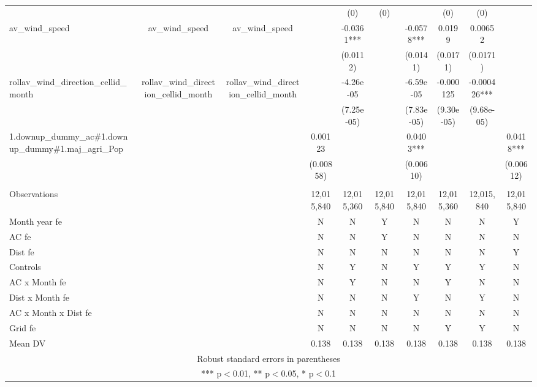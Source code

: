 \documentclass[]{article}
\begin{document}
\begin{tabular}{lccccccccc}
 &  &  &  & (0) & (0) &  & (0) & (0) &  \\
av\_wind\_speed & av\_wind\_speed & av\_wind\_speed &  & -0.0361*** &  & -0.0578*** & 0.0199 & 0.00652 &  \\
 &  &  &  & (0.0112) &  & (0.0141) & (0.0171) & (0.0171) &  \\
rollav\_wind\_direction\_cellid\_month & rollav\_wind\_direction\_cellid\_month & rollav\_wind\_direction\_cellid\_month &  & -4.26e-05 &  & -6.59e-05 & -0.000125 & -0.000426*** &  \\
 &  &  &  & (7.25e-05) &  & (7.83e-05) & (9.30e-05) & (9.68e-05) &  \\
1.downup\_dummy\_ac\#1.downup\_dummy\#1.maj\_agri\_Pop &  &  & 0.00123 &  &  & 0.0403*** &  &  & 0.0418*** \\
 &  &  & (0.00858) &  &  & (0.00610) &  &  & (0.00612) \\
 &  &  &  &  &  &  &  &  &  \\
Observations &  &  & 12,015,840 & 12,015,360 & 12,015,840 & 12,015,840 & 12,015,360 & 12,015,840 & 12,015,840 \\
Month year fe &  &  & N & N & Y & N & N & N & Y \\
AC fe &  &  & N & N & Y & N & N & N & N \\
Dist fe &  &  & N & N & N & N & N & N & Y \\
Controls &  &  & N & Y & N & Y & Y & Y & N \\
AC x Month fe &  &  & N & Y & N & N & Y & N & N \\
Dist x Month fe &  &  & N & N & N & Y & N & Y & N \\
AC x Month x Dist fe &  &  & N & N & N & N & N & N & N \\
Grid fe &  &  & N & N & N & N & Y & Y & N \\
 Mean DV &  &  & 0.138 & 0.138 & 0.138 & 0.138 & 0.138 & 0.138 & 0.138 \\ \hline
\multicolumn{10}{c}{ Robust standard errors in parentheses} \\
\multicolumn{10}{c}{ *** p$<$0.01, ** p$<$0.05, * p$<$0.1} \\
\end{tabular}
\end{document}
